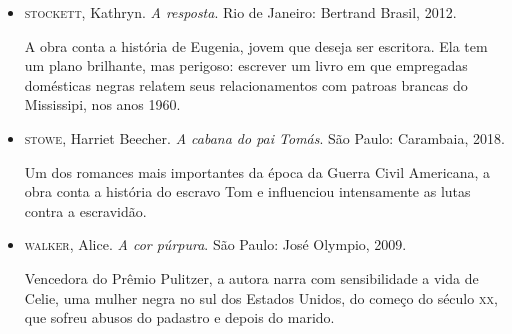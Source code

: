 \documentclass[12pt]{extarticle}
\begin{document}
\begin{itemize}
\item
\textsc{stockett}, Kathryn. \textit{A resposta}. Rio de Janeiro: Bertrand
Brasil, 2012.

A obra conta a história de Eugenia, jovem que deseja ser escritora. Ela
tem um plano brilhante, mas perigoso: escrever um livro em que
empregadas domésticas negras relatem seus relacionamentos com patroas
brancas do Mississipi, nos anos 1960.

\item
\textsc{stowe}, Harriet Beecher. \textit{A cabana do pai Tomás}. São Paulo:
Carambaia, 2018.

Um dos romances mais importantes da época da Guerra Civil Americana, a
obra conta a história do escravo Tom e influenciou intensamente as lutas
contra a escravidão.

\item
\textsc{walker}, Alice. \textit{A cor púrpura}. São Paulo: José Olympio, 2009.

Vencedora do Prêmio Pulitzer, a autora narra com sensibilidade a vida de
Celie, uma mulher negra no sul dos Estados Unidos, do começo do século
\textsc{xx}, que sofreu abusos do padastro e depois do marido.

\end{itemize}
\end{document}
